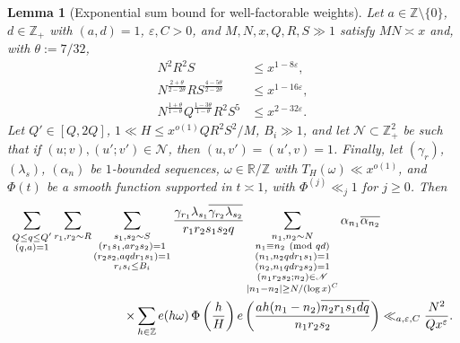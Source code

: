 \documentclass[reqno,11pt]{amsart}
\newtheorem{lemma}[theorem]{Lemma}
\theoremstyle{remark}
\numberwithin{equation}{section}
\newcommand{\Z}{\mathbb{Z}}
\newcommand{\R}{\mathbb{R}}
\newcommand{\msN}{\mathscr{N}}
\newcommand{\eps}{\varepsilon}
\renewcommand{\bar}{\overline}
\renewcommand{\pmod}[1]{\ (\textnormal{mod } #1)}
\begin{document}
\begin{lemma}[Exponential sum bound for well-factorable weights] \label{lem:expo-bound-well-fact}
Let $a \in \Z \setminus \{0\}$, $d \in \Z_+$ with $(a, d) = 1$, $\eps, C > 0$, and $M, N, x, Q, R, S \gg 1$ satisfy $MN \asymp x$ and, with $\theta := 7/32$,
\begin{equation} \label{eq:ranges-qrs}
\begin{aligned}
    N^2 R^2 S &\le x^{1-8\eps}, 
    \\
    N^{\frac{2+\theta}{2-2\theta}} R S^{\frac{4-5\theta}{2-2\theta}}
    &\le 
    x^{1-16\eps},
    \\ 
    N^{\frac{1+\theta}{1-\theta}} Q^{\frac{1-3\theta}{1-\theta}} R^{2} S^{5} &\le 
    x^{2-32\eps}.
\end{aligned}
\end{equation}
Let $Q' \in [Q, 2Q]$, $1 \ll H \le x^{o(1)} Q R^2 S^2/M$, $B_i \gg 1$, and let $\msN \subset \Z_+^2$ be such that if $(u; v), (u'; v') \in \msN$, then $(u, v') = (u', v) = 1$. Finally, let $(\gamma_r)$, $(\lambda_s)$, $(\alpha_n)$ be $1$-bounded sequences, $\omega \in \R/\Z$ with $T_H(\omega) \ll x^{o(1)}$, and $\Phi(t)$ be a smooth function supported in $t \asymp 1$, with $\Phi^{(j)} \ll_j 1$ for $j \ge 0$. Then
\[
\begin{aligned}
    \sum_{\substack{Q \le q \le Q' \\ (q, a) = 1}}
    \sum_{r_1, r_2 \sim R}
    \sum_{\substack{s_1, s_2 \sim S \\ (r_1s_1, ar_2s_2) = 1 \\ (r_2 s_2, a q d r_1 s_1) = 1 \\ r_i s_i \le B_i}} 
    \frac{\gamma_{r_1} \lambda_{s_1} \bar{\gamma_{r_2}\lambda_{s_2}}}{r_1 r_2 s_1 s_2 q}
    \sum_{\substack{n_1, n_2 \sim N \\ n_1 \equiv n_2 \pmod{qd} \\ (n_1, n_2 q d r_1 s_1) = 1 \\ (n_2, n_1 q d r_2 s_2) = 1 \\ (n_1 r_2 s_2; n_2) \in \msN \\ |n_1 - n_2| \ge N/(\log x)^C}} 
    \alpha_{n_1} \bar{\alpha_{n_2}}&
    \\
    \times 
    \sum_{h \in \Z} e(h\omega)\, \Phi\left(\frac{h}{H}\right) 
    e\left(\frac{ah(n_1 - n_2) \bar{n_2 r_1 s_1 dq}}{n_1 r_2 s_2}\right)&
    \ll_{a,\eps,C}
    \frac{N^2}{Qx^\eps}.
\end{aligned}
\]
\end{lemma}
\end{document}

